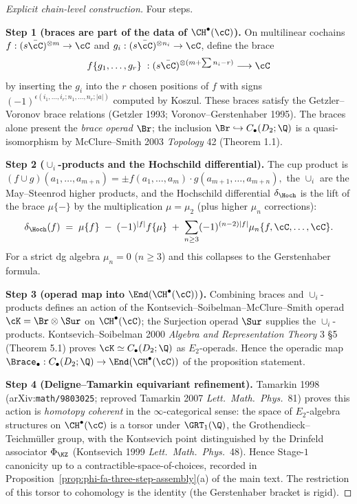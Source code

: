 \begin{proof}[Explicit chain-level construction]
Four steps.

\textbf{Step 1 (braces are part of the data of
$\CH^\bullet(\cC)$).} On multilinear cochains $f:(s\bar\cC)^{\otimes
m}\to\cC$ and $g_i:(s\bar\cC)^{\otimes n_i}\to\cC$, define the brace
\[
f\{g_1,\ldots,g_r\}\;:(s\bar\cC)^{\otimes
(m+\sum n_i - r)}\longrightarrow\cC
\]
by inserting the $g_i$ into the $r$ chosen positions of $f$ with signs
$(-1)^{\epsilon(i_1,\ldots,i_r;n_1,\ldots,n_r;|a|)}$ computed by
Koszul. These braces satisfy the Getzler--Voronov brace relations
(Getzler 1993; Voronov--Gerstenhaber 1995). The braces alone present the
\emph{brace operad} $\Br$; the inclusion $\Br\hookrightarrow
C_\bullet(D_2;\Q)$ is a quasi-isomorphism by McClure--Smith 2003
\emph{Topology} 42 (Theorem 1.1).

\textbf{Step 2 ($\cup_i$-products and the Hochschild differential).}
The cup product is
\(
(f\cup g)(a_1,\ldots,a_{m+n})=\pm f(a_1,\ldots,a_m)\cdot
g(a_{m+1},\ldots,a_{m+n}),
\)
the $\cup_i$ are the May--Steenrod higher products, and the
Hochschild differential $\delta_\Hoch$ is the lift of the brace
$\mu\{-\}$ by the multiplication $\mu=\mu_2$ (plus higher $\mu_n$
corrections):
\[
\delta_\Hoch(f)\;=\;\mu\{f\}\;-\;(-1)^{|f|}f\{\mu\}
\;+\;\sum_{n\geq 3}(-1)^{(n-2)|f|}\mu_n\{f,\cC,\ldots,\cC\}.
\]
For a strict dg algebra $\mu_n=0$ ($n\geq 3$) and this collapses to
the Gerstenhaber formula.

\textbf{Step 3 (operad map into $\End(\CH^\bullet(\cC))$).}
Combining braces and $\cup_i$-products defines an action of the
Kontsevich--Soibelman--McClure--Smith operad $\cK = \Br\otimes\Sur$ on
$\CH^\bullet(\cC)$; the Surjection operad $\Sur$ supplies the
$\cup_i$-products. Kontsevich--Soibelman 2000 \emph{Algebra and
Representation Theory} 3 \S 5 (Theorem 5.1) proves
$\cK\simeq C_\bullet(D_2;\Q)$ as $E_2$-operads. Hence the operadic map
\(
\Brace_\bullet:C_\bullet(D_2;\Q)\to\End(\CH^\bullet(\cC))
\)
of the proposition statement.

\textbf{Step 4 (Deligne--Tamarkin equivariant refinement).} Tamarkin
1998 (arXiv:\texttt{math/9803025}; reproved Tamarkin 2007
\emph{Lett.\ Math.\ Phys.}\ 81) proves this action is \emph{homotopy
coherent} in the $\infty$-categorical sense: the space of
$E_2$-algebra structures on $\CH^\bullet(\cC)$ is a torsor under
$\GRT_1(\Q)$, the Grothendieck--Teichm\"uller group, with the
Kontsevich point distinguished by the Drinfeld associator
$\Phi_{\KZ}$ (Kontsevich 1999 \emph{Lett.\ Math.\ Phys.}\ 48). Hence
Stage-$1$ canonicity up to a contractible-space-of-choices, recorded
in Proposition~\ref{prop:phi-fa-three-step-assembly}(a) of the main
text. The restriction of this torsor to cohomology is the identity
(the Gerstenhaber bracket is rigid).
\end{proof}

